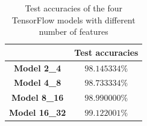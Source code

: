 \begin{table}
	\centering
	\begin{tabular}{cc}
		\hline
		& \textbf{Test accuracies} \\
		\hline
		\textbf{Model 2\_4} & $98.145334 \%$ \\
		\textbf{Model 4\_8} & $98.733334 \%$ \\
		\textbf{Model 8\_16} & $98.990000 \%$ \\
		\textbf{Model 16\_32} & $99.122001 \%$ \\
		\hline
	\end{tabular}
	\caption{Test accuracies of the four TensorFlow models with different number of features}
	\label{tab:test_accuracies}
\end{table}
